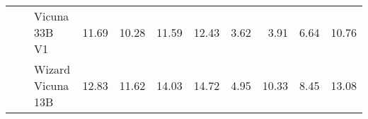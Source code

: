 \begin{table}[!htbp]
\begin{tabular}{l|l|l|rrrr|rrrr}
 &  & Vicuna 33B V1 & {\cellcolor[HTML]{FDE5E2}} \color[HTML]{000000} 11.69 & {\cellcolor[HTML]{FEE9E6}} \color[HTML]{000000} 10.28 & {\cellcolor[HTML]{FDE5E2}} \color[HTML]{000000} 11.59 & {\cellcolor[HTML]{FDE3E0}} \color[HTML]{000000} 12.43 & {\cellcolor[HTML]{F7FCFD}} \color[HTML]{000000} 3.62 & {\cellcolor[HTML]{F7FCFD}} \color[HTML]{000000} 3.91 & {\cellcolor[HTML]{F2FAFC}} \color[HTML]{000000} 6.64 & {\cellcolor[HTML]{EBF7FA}} \color[HTML]{000000} 10.76 \\
 &  & Wizard Vicuna 13B  & {\cellcolor[HTML]{FDE1DE}} \color[HTML]{000000} 12.83 & {\cellcolor[HTML]{FDE5E2}} \color[HTML]{000000} 11.62 & {\cellcolor[HTML]{FDDDDA}} \color[HTML]{000000} 14.03 & {\cellcolor[HTML]{FDDBD7}} \color[HTML]{000000} 14.72 & {\cellcolor[HTML]{F5FBFC}} \color[HTML]{000000} 4.95 & {\cellcolor[HTML]{ECF8FA}} \color[HTML]{000000} 10.33 & {\cellcolor[HTML]{EFF9FB}} \color[HTML]{000000} 8.45 & {\cellcolor[HTML]{E7F6F9}} \color[HTML]{000000} 13.08 \\


\end{tabular}
\end{table}
